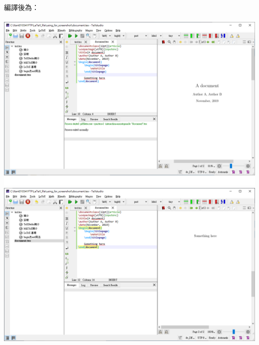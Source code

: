 \documentclass[12pt]{article}
\begin{document}
\begin{CJK*}{UTF8}{bsmi}
			\newpage
			編譯後為：\\ \\
			\includegraphics[scale=0.5]{easy_sample} \\
			\includegraphics[scale=0.5]{easy_sample_2}
			
		\newpage
		

\end{CJK*}
\end{document}

